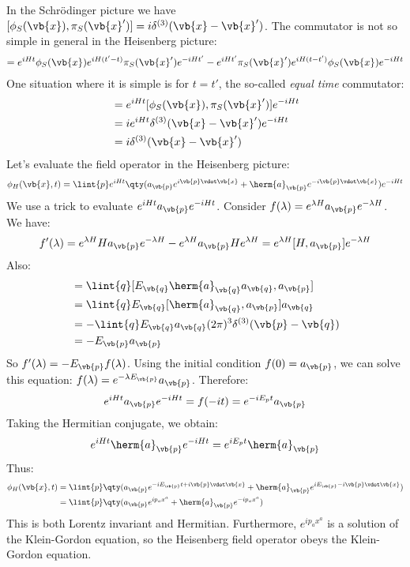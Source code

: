 \documentclass{jknotes} %
\begin{document}
In the Schr\"odinger picture we have \([\phi_S(\vb{x}),\pi_S(\vb{x}')] = i\delta^{(3)}(\vb{x}-\vb{x}')\). The commutator is not so simple in general in the Heisenberg picture:
\begin{align}
    [\phi_H(\vb{x},t), \pi_H(\vb{x}',t')] = e^{iHt}\phi_S(\vb{x})e^{iH(t'-t)}\pi_S(\vb{x}')e^{-iHt'} - e^{iHt'}\pi_S(\vb{x}')e^{iH(t-t')}\phi_S(\vb{x})e^{-iHt}
\end{align}
One situation where it is simple is for \(t=t'\), the so-called \emph{equal time} commutator:
\begin{align}
    [\phi_H(\vb{x},t), \pi_H(\vb{x}',t)] &= e^{iHt}[\phi_S(\vb{x}),\pi_S(\vb{x}')]e^{-iHt} \\
    &= ie^{iHt}\delta^{(3)}(\vb{x}-\vb{x}')e^{-iHt} \\
    &= i\delta^{(3)}(\vb{x}-\vb{x}')
\end{align}
Let's evaluate the field operator in the Heisenberg picture:
\begin{equation}
    \phi_H(\vb{x},t) = \lint{p}e^{iHt}\qty(a_{\vb{p}}e^{i\vb{p}\vdot\vb{x}}+\herm{a}_{\vb{p}}e^{-i\vb{p}\vdot\vb{x}})e^{-iHt}
\end{equation}
We use a trick to evaluate \(e^{iHt}a_{\vb{p}}e^{-iHt}\). Consider \(f(\lambda) = e^{\lambda H}a_{\vb{p}}e^{-\lambda H}\). We have:
\begin{equation}
    f'(\lambda) = e^{\lambda H}Ha_{\vb{p}}e^{-\lambda H} - e^{\lambda H}a_{\vb{p}}He^{\lambda H} = e^{\lambda H}[H,a_{\vb{p}}]e^{-\lambda H}
\end{equation}
Also:
\begin{align}
    [H,a_{\vb{p}}] &= \lint{q}[E_{\vb{q}}\herm{a}_{\vb{q}}a_{\vb{q}},a_{\vb{p}}] \\
    &= \lint{q}E_{\vb{q}}[\herm{a}_{\vb{q}},a_{\vb{p}}]a_{\vb{q}} \\
    &= -\lint{q} E_{\vb{q}}a_{\vb{q}}(2\pi)^3\delta^{(3)}(\vb{p}-\vb{q}) \\
    &= -E_{\vb{p}}a_{\vb{p}}
\end{align}
So \(f'(\lambda) = -E_{\vb{p}}f(\lambda)\). Using the initial condition \(f(0) = a_{\vb{p}}\), we can solve this equation: \(f(\lambda) = e^{-\lambda E_{\vb{p}}}a_{\vb{p}}\). Therefore:
\begin{equation}
    e^{iHt}a_{\vb{p}}e^{-iHt} = f(-it) = e^{-iE_p t}a_{\vb{p}}
\end{equation}
Taking the Hermitian conjugate, we obtain:
\begin{equation}
    e^{iHt}\herm{a}_{\vb{p}}e^{-iHt} = e^{iE_p t}\herm{a}_{\vb{p}}
\end{equation}
Thus:
\begin{align}
    \phi_H(\vb{x},t) &= \lint{p} \qty(a_{\vb{p}}e^{-iE_{\vb{p}}t+i\vb{p}\vdot\vb{x}} + \herm{a}_{\vb{p}}e^{iE_{\vb{p}} - i\vb{p}\vdot\vb{x}}) \\
    &= \lint{p} \qty(a_{\vb{p}}e^{ip_ax^a} + \herm{a}_{\vb{p}}e^{-ip_ax^a})
\end{align}
This is both Lorentz invariant and Hermitian. Furthermore, \(e^{ip_ax^a}\) is a solution of the Klein-Gordon equation, so the Heisenberg field operator obeys the Klein-Gordon equation.
\end{document}
